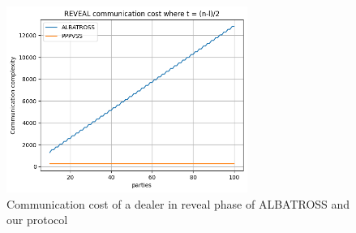 \begin{figure}[H]
  \centering
  \includegraphics[width=0.7\textwidth]{figures/reveal_comm.png}
  \caption{Communication cost of a dealer in reveal phase of ALBATROSS and our protocol}
  \label{fig:comm_reveal}
\end{figure}